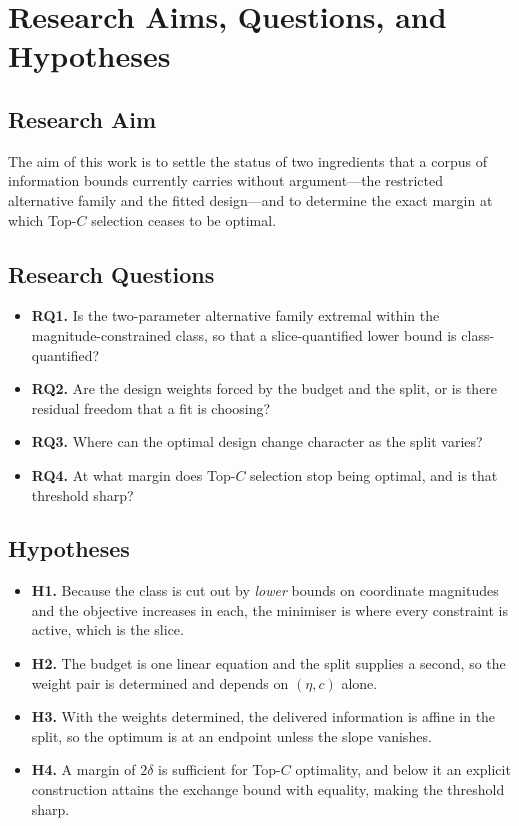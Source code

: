 \documentclass[conference]{IEEEtran}
\theoremstyle{definition}
\begin{document}
\section{Research Aims, Questions, and Hypotheses}

\subsection{Research Aim}

The aim of this work is to settle the status of two ingredients that a corpus of information
bounds currently carries without argument---the restricted alternative family and the fitted
design---and to determine the exact margin at which Top-$C$ selection ceases to be optimal.

\subsection{Research Questions}

\begin{itemize}
\item \textbf{RQ1.} Is the two-parameter alternative family extremal within the
magnitude-constrained class, so that a slice-quantified lower bound is class-quantified?
\item \textbf{RQ2.} Are the design weights forced by the budget and the split, or is there
residual freedom that a fit is choosing?
\item \textbf{RQ3.} Where can the optimal design change character as the split varies?
\item \textbf{RQ4.} At what margin does Top-$C$ selection stop being optimal, and is that
threshold sharp?
\end{itemize}

\subsection{Hypotheses}

\begin{itemize}
\item \textbf{H1.} Because the class is cut out by \emph{lower} bounds on coordinate
magnitudes and the objective increases in each, the minimiser is where every constraint is
active, which is the slice.
\item \textbf{H2.} The budget is one linear equation and the split supplies a second, so the
weight pair is determined and depends on $(\eta,c)$ alone.
\item \textbf{H3.} With the weights determined, the delivered information is affine in the
split, so the optimum is at an endpoint unless the slope vanishes.
\item \textbf{H4.} A margin of $2\delta$ is sufficient for Top-$C$ optimality, and below it
an explicit construction attains the exchange bound with equality, making the threshold
sharp.
\end{itemize}
\end{document}
